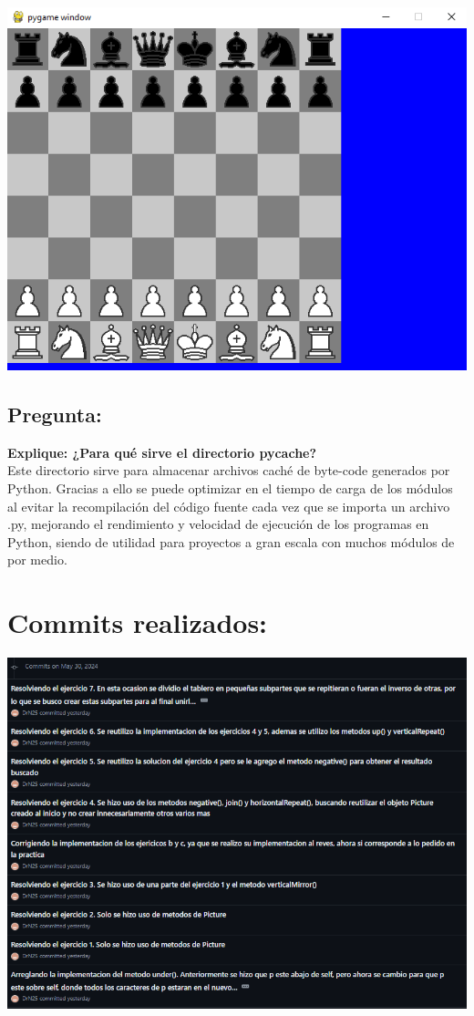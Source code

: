 \documentclass{article}
\begin{document}
\begin{itemize}
\includegraphics[width=\textwidth]{img/22.png}
\end{itemize}
\subsection*{Pregunta:}
\textbf{Explique: ¿Para qué sirve el directorio pycache?}\\
Este directorio sirve para almacenar archivos caché de byte-code generados por Python. Gracias a ello se puede optimizar en el tiempo de carga de los módulos al evitar la recompilación del código fuente cada vez que se importa un archivo .py, mejorando el rendimiento y velocidad de ejecución de los programas en Python, siendo de utilidad para proyectos a gran escala con muchos módulos de por medio.

\section{Commits realizados:}

\includegraphics[width=\textwidth]{img/commits1.png}
\end{document}
